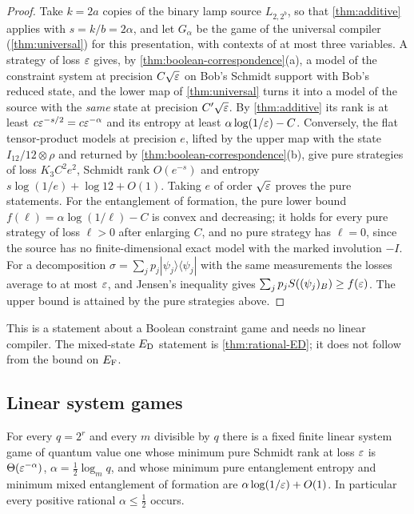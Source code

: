 \begin{proof}
Take $k=2a$ copies of the binary lamp source $L_{2,2^b}$, so that \cref{thm:additive} applies with $s=k/b=2\alpha$, and let
$G_\alpha$ be the game of the universal compiler (\cref{thm:universal}) for this presentation, with contexts of at most three
variables. A strategy of loss $\varepsilon$ gives, by \cref{thm:boolean-correspondence}(a), a model of the constraint system at precision
$C\sqrt{\varepsilon}$ on Bob's Schmidt support with Bob's reduced state, and the lower map of \cref{thm:universal} turns it into a model
of the source with the \emph{same} state at precision $C'\sqrt{\varepsilon}$. By \cref{thm:additive} its rank is at least
$c\varepsilon^{-s/2}=c\varepsilon^{-\alpha}$ and its entropy at least $\alpha\log(1/\varepsilon)-C$. Conversely, the flat tensor-product models at
precision $e$, lifted by the upper map with the state $I_{12}/12\otimes\rho$ and returned by
\cref{thm:boolean-correspondence}(b), give pure strategies of loss $K_3C^2e^2$, Schmidt rank $O(e^{-s})$ and entropy
$s\log(1/e)+\log12+O(1)$. Taking $e$ of order $\sqrt{\varepsilon}$ proves the pure statements. For the entanglement of formation,
the pure lower bound $f(\ell)=\alpha\log(1/\ell)-C$ is convex and decreasing; it holds for every pure strategy of loss $\ell>0$
after enlarging $C$, and no pure strategy has $\ell=0$, since the source has no finite-dimensional exact model with the
marked involution $-I$. For a decomposition $\sigma=\sum_jp_j|\psi_j\rangle\langle\psi_j|$ with the same measurements the losses
average to at most $\varepsilon$, and Jensen's inequality gives $\sum_jp_jS((\psi_j)_B)\ge f(\varepsilon)$. The upper bound is attained by
the pure strategies above.
\end{proof}

This is a statement about a Boolean constraint game and needs no linear compiler. The mixed-state $E_{\mathrm D}$ statement is
\cref{thm:rational-ED}; it does not follow from the bound on $E_{\mathrm F}$.

\subsection{Linear system games}\label{sec:rational-linear}

\begin{theorem}\label{thm:rational-linear}
For every $q=2^r$ and every $m$ divisible by $q$ there is a fixed finite linear system game of quantum value one whose minimum
pure Schmidt rank at loss $\varepsilon$ is $\Theta(\varepsilon^{-\alpha})$, $\alpha=\frac12\log_mq$, and whose minimum pure entanglement
entropy and minimum mixed entanglement of formation are $\alpha\log(1/\varepsilon)+O(1)$. In particular every positive rational
$\alpha\le\frac12$ occurs.
\end{theorem}

